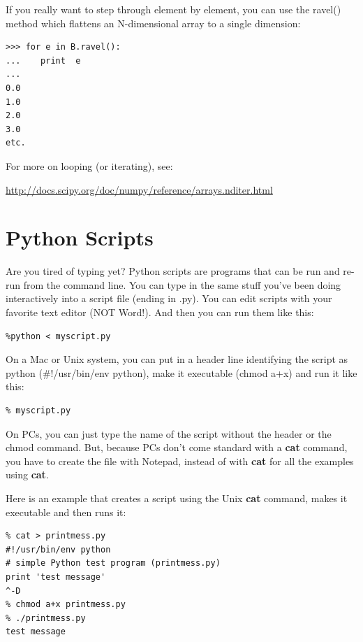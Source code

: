 \documentclass[11pt]{book}
\begin{document}
{If you really want to step through element by element, you can use the {\color{blue}ravel()} method which flattens an N-dimensional array to a single dimension:

{ \color{blue} \begin{verbatim}
>>> for e in B.ravel():
...    print  e
... 
0.0
1.0
2.0
3.0
etc.
\end{verbatim}}

For more on looping (or iterating), see:

\url{http://docs.scipy.org/doc/numpy/reference/arrays.nditer.html}



\section{Python Scripts}

Are you tired of typing yet? Python scripts are programs that can be run and re-run from the command line.
You can type in the same stuff you've been doing interactively into a script file (ending in .py). You can edit scripts with your favorite text editor (NOT Word!).   And then you can run them like this:

{ \color{blue} \begin{verbatim}
%python < myscript.py
\end{verbatim}}

On a Mac or Unix system,  you can put in a header line identifying the script as python (\#!/usr/bin/env python), make  it executable (chmod a+x)  and   run it like this:

{ \color{blue} \begin{verbatim}
% myscript.py
\end{verbatim}}

On PCs, you can just type the name of the script without the header or the chmod command.   But, because PCs don't come standard with a {\bf cat} command, you have to create the file with Notepad, instead of with {\bf cat} for all the examples using {\bf cat}.  

Here is an example that creates a script using the Unix {\bf cat} command, makes it executable and then runs it:

{ \color{blue} \begin{verbatim}
% cat > printmess.py
#!/usr/bin/env python
# simple Python test program (printmess.py)
print 'test message'
^-D
% chmod a+x printmess.py
% ./printmess.py
test message
\end{verbatim}}

}
\end{document}
